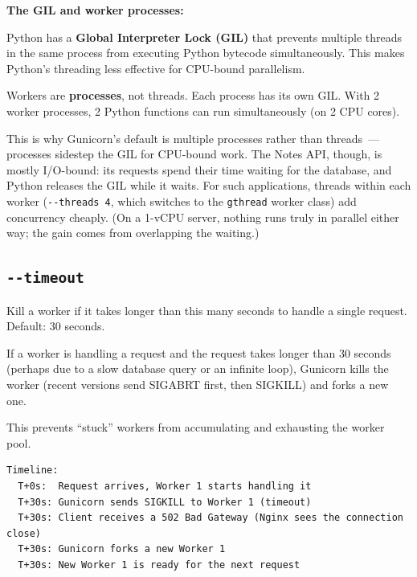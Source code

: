 \textbf{The GIL and worker processes:}

Python has a \textbf{Global Interpreter Lock (GIL)} that prevents multiple threads in the same process from executing Python bytecode simultaneously. This makes Python's threading less effective for CPU-bound parallelism.

Workers are \textbf{processes}, not threads. Each process has its own GIL. With 2 worker processes, 2 Python functions can run simultaneously (on 2 CPU cores).

This is why Gunicorn's default is multiple processes rather than threads~--- processes sidestep the GIL for CPU-bound work. The Notes API, though, is mostly I/O-bound: its requests spend their time waiting for the database, and Python releases the GIL while it waits. For such applications, threads within each worker (\texttt{-\/-threads\ 4}, which switches to the \texttt{gthread} worker class) add concurrency cheaply. (On a 1-vCPU server, nothing runs truly in parallel either way; the gain comes from overlapping the waiting.)

\subsection*{\texorpdfstring{\texttt{-\/-timeout}}{-\/-timeout}}\label{24-process-startup:--timeout}

Kill a worker if it takes longer than this many seconds to handle a single request. Default: 30 seconds.

If a worker is handling a request and the request takes longer than 30 seconds (perhaps due to a slow database query or an infinite loop), Gunicorn kills the worker (recent versions send SIGABRT first, then SIGKILL) and forks a new one.

This prevents ``stuck'' workers from accumulating and exhausting the worker pool.

\begin{outputbox}[short]
\begin{Verbatim}[fontsize=\codesize, breaklines, breakanywhere, breaksymbolleft={\tiny\textcolor{muted}{$\hookrightarrow$}}]
Timeline:
  T+0s:  Request arrives, Worker 1 starts handling it
  T+30s: Gunicorn sends SIGKILL to Worker 1 (timeout)
  T+30s: Client receives a 502 Bad Gateway (Nginx sees the connection close)
  T+30s: Gunicorn forks a new Worker 1
  T+30s: New Worker 1 is ready for the next request
\end{Verbatim}
\end{outputbox}


